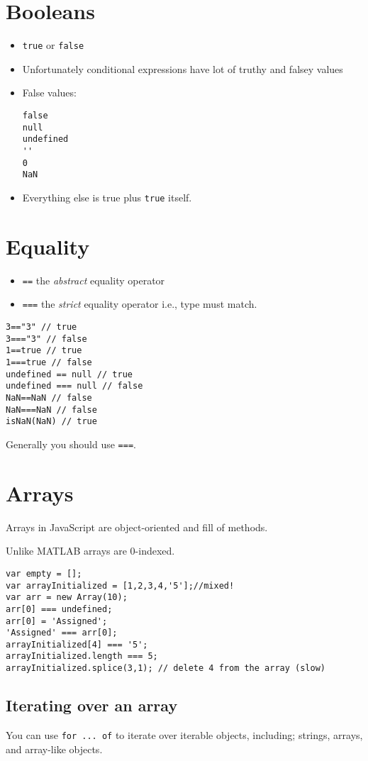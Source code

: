 \documentclass[../CMPUT-404-Notes.tex]{subfiles}
\begin{document}
\section{Booleans}
\begin{itemize}
    \item \texttt{true} or \texttt{false}
    \item Unfortunately conditional expressions have lot of truthy and falsey values
    \item False values: 
    \begin{verbatim}
false
null
undefined
''
0
NaN
    \end{verbatim}
    \item Everything else is true plus \texttt{true} itself.    
\end{itemize}

\section{Equality}
\begin{itemize}
    \item \texttt{==} the \emph{abstract} equality operator
    \item \texttt{===} the \emph{strict} equality operator i.e., type must match.
\end{itemize}
\begin{verbatim}
3=="3" // true
3==="3" // false
1==true // true
1===true // false
undefined == null // true
undefined === null // false
NaN==NaN // false
NaN===NaN // false
isNaN(NaN) // true
\end{verbatim}
Generally you should use \texttt{===}.

\section{Arrays}
Arrays in JavaScript are object-oriented and fill of methods.

Unlike MATLAB arrays are 0-indexed.
\begin{verbatim}
var empty = [];
var arrayInitialized = [1,2,3,4,'5'];//mixed!
var arr = new Array(10);
arr[0] === undefined;
arr[0] = 'Assigned';
'Assigned' === arr[0];
arrayInitialized[4] === '5';
arrayInitialized.length === 5;
arrayInitialized.splice(3,1); // delete 4 from the array (slow)
\end{verbatim}

\subsection{Iterating over an array}
You can use \texttt{for ... of} to iterate over iterable objects, including; strings, arrays, and array-like objects.
\end{document}

